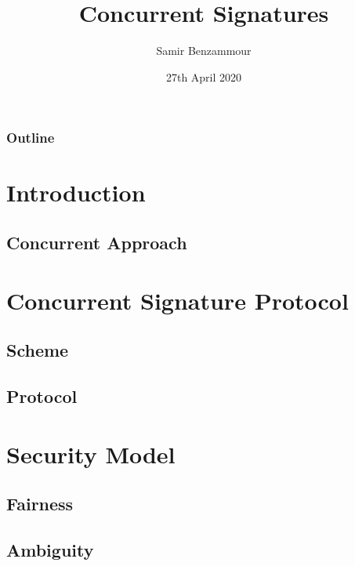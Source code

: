 \documentclass[usenames,dvipsnames]{beamer}
\title{Concurrent Signatures}
\author{Samir Benzammour}
\date{27th April 2020}
\institute[RWTH]{
  Algorithms and Computational Complexity\\
  RWTH Aachen University
}
\begin{document}
\frame{\titlepage}

\begin{frame}
	\frametitle{Outline}
	\tableofcontents
\end{frame}

\section{Introduction}


\subsection{Concurrent Approach}


\section{Concurrent Signature Protocol}

  \subsection{Scheme}
  

  \subsection{Protocol}
  

\section{Security Model}


  \subsection{Fairness}
  

  \subsection{Ambiguity}
  
\end{document}

